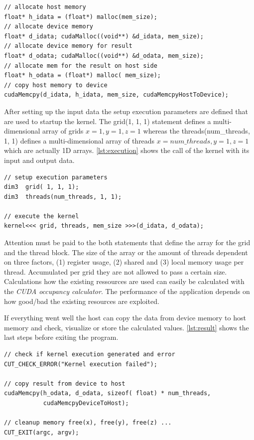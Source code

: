 \begin{lstlisting}[caption=Data transfer of data, label=lst:datatransfer]
// allocate host memory 
float* h_idata = (float*) malloc(mem_size);
// allocate device memory 
float* d_idata; cudaMalloc((void**) &d_idata, mem_size);
// allocate device memory for result
float* d_odata; cudaMalloc((void**) &d_odata, mem_size);
// allocate mem for the result on host side
float* h_odata = (float*) malloc( mem_size);
// copy host memory to device 
cudaMemcpy(d_idata, h_idata, mem_size, cudaMemcpyHostToDevice);
\end{lstlisting} 


After setting up the input data the setup execution parameters are defined that
are used to startup the kernel. The \textsf{grid(1, 1, 1)} statement defines
a multi-dimensional array of grids $x=1, y=1, z=1$ whereas the
\textsf{threads(num\_threads, 1, 1)} defines a multi-dimensional array of
threads $x=num\_threads, y=1, z=1$ which are actually \gls{1D} arrays.
\autoref{lst:execution} shows the call of the kernel with its input and
output data.


\begin{lstlisting}[caption=Execution of the Kernel, label=lst:execution]
// setup execution parameters
dim3  grid( 1, 1, 1);
dim3  threads(num_threads, 1, 1);

// execute the kernel
kernel<<< grid, threads, mem_size >>>(d_idata, d_odata);
\end{lstlisting} 

Attention must be paid to the both statements that define the array for the grid
and the thread block. The size of the array or the amount of threads dependent
on three factors, (1) register usage, (2) shared and (3) local memory usage per
thread. Accumulated per grid they are not allowed to pass a certain size.
Calculations how the existing ressources are used can easily be calculated with
the \emph{CUDA occupancy calculator}. The performance of the application depends
on how good/bad the existing resources are exploited.

If everything went well the host can copy the data from device memory
to host memory and check, visualize or store the calculated values.
\autoref{lst:result} shows the last steps before exiting the program.

\begin{lstlisting}[caption=Retrieving of the Results, label=lst:result]
// check if kernel execution generated and error
CUT_CHECK_ERROR("Kernel execution failed");
 
// copy result from device to host
cudaMemcpy(h_odata, d_odata, sizeof( float) * num_threads, 
           cudaMemcpyDeviceToHost);

// cleanup memory free(x), free(y), free(z) ...
CUT_EXIT(argc, argv);
\end{lstlisting} 

